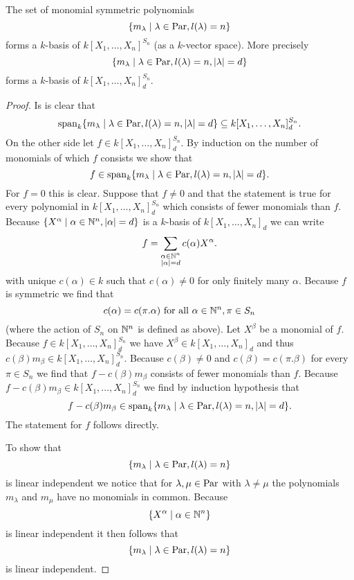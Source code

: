 \begin{lem}
 The set of monomial symmetric polynomials
 \[
  \{m_\lambda \mid \lambda \in \operatorname{Par}, l(\lambda) = n\}
 \]
 forms a $k$-basis of $k[X_1, \ldots, X_n]^{S_n}$ (as a $k$-vector space). More precisely
 \[
  \{m_\lambda \mid \lambda \in \operatorname{Par}, l(\lambda) = n, |\lambda|=d \}
 \]
 forms a $k$-basis of $k[X_1, \ldots, X_n]^{S_n}_d$.
\end{lem}
\begin{proof}
 Is is clear that
 \[
  \operatorname{span}_k \{m_\lambda \mid \lambda \in \operatorname{Par}, l(\lambda) = n, |\lambda|=d \} \subseteq k[X_1, \ldots, X_n]^{S_n}_d.
 \]
 On the other side let $f \in k[X_1, \ldots, X_n]^{S_n}_d$. By induction on the number of monomials of which $f$ consists we show that
 \[
  f \in \operatorname{span}_k \{m_\lambda \mid \lambda \in \operatorname{Par}, l(\lambda) = n, |\lambda|=d\}.
 \]
 For $f = 0$ this is clear. Suppose that $f \neq 0$ and that the statement is true for every polynomial in $k[X_1, \ldots, X_n]^{S_n}_d$ which consists of fewer monomials than $f$. Because $\{X^\alpha \mid \alpha \in \mathbb{N}^n, |\alpha|=d \}$ is a $k$-basis of $k[X_1, \ldots, X_n]_d$ we can write
 \[
  f = \sum_{\substack{\alpha \in \mathbb{N}^n \\ |\alpha|=d}} c(\alpha) X^\alpha.
 \]
 with unique $c(\alpha) \in k$ such that $c(\alpha) \neq 0$ for only finitely many $\alpha$. Because $f$ is symmetric we find that
 \[
  c(\alpha) = c(\pi.\alpha) \text{ for all } \alpha \in \mathbb{N}^n, \pi \in S_n
 \]
 (where the action of $S_n$ on $\mathbb{N}^n$ is defined as above). Let $X^\beta$ be a monomial of $f$. Because $f \in k[X_1, \ldots, X_n]^{S_n}_d$ we have $X^\beta \in k[X_1, \ldots, X_n]_d$ and thus $c(\beta) m_\beta \in k[X_1, \ldots, X_n]^{S_n}_d$. Because $c(\beta) \neq 0$ and $c(\beta) = c(\pi.\beta)$ for every $\pi \in S_n$ we find that $f-c(\beta)m_\beta$ consists of fewer monomials than $f$. Because $f-c(\beta)m_\beta \in k[X_1, \ldots, X_n]^{S_n}_d$ we find by induction hypothesis that
 \[
  f - c(\beta)m_\beta \in \operatorname{span}_k \{m_\lambda \mid \lambda \in \operatorname{Par}, l(\lambda) = n, |\lambda|=d\}.
 \]
 The statement for $f$ follows directly.
 
 To show that
 \[
  \{m_\lambda \mid \lambda \in \operatorname{Par}, l(\lambda) = n\}
 \]
 is linear independent we notice that for $\lambda, \mu \in \operatorname{Par}$ with $\lambda \neq \mu$ the polynomials $m_\lambda$ and $m_\mu$ have no monomials in common. Because
 \[
  \{X^\alpha \mid \alpha \in \mathbb{N}^n\}
 \]
 is linear independent it then follows that
 \[
  \{m_\lambda \mid \lambda \in \operatorname{Par}, l(\lambda) = n\}
 \]
 is linear independent.
\end{proof}


